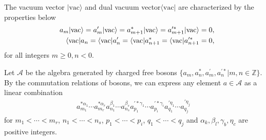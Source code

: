 \documentclass[10pt,a4paper]{amsart}
\numberwithin{equation}{section}
\begin{document}
The vacuum vector $|\text{vac}\rangle$ and  dual vacuum vector$\langle \text{vac}|$   are characterized by the properties below
\begin{eqnarray}\label{boson annihilation relations}
&&a_{m}|\text{vac}\rangle=a^{\prime}_{m}|\text{vac}\rangle
=a^{\ast}_{m+1}|\text{vac}\rangle=a^{\prime\ast}_{m+1}|\text{vac}\rangle=0,\notag\\
&&\langle\text{vac}|a_{n}=\langle\text{vac}|a^{\prime}_{n}
=\langle\text{vac}|a^{\ast}_{n+1}=\langle\text{vac}|a^{\prime\ast}_{n+1}=0,
\end{eqnarray}
for all integers $m\geq0, n<0$.




Let $\mathcal{A}$ be the algebra generated by charged free bosons $\{a_{m},a^{\ast}_{n},a^{\prime}_{m},a^{\prime\ast}_{n}|m,n\in\mathbb{Z}\}$. By the commutation relations of bosons, we can express any element $a\in\mathcal{A}$ as a linear combination
\begin{eqnarray}
a^{\ast\alpha_{1}}_{m_{1}}\cdots a^{\ast\alpha_{r}}_{m_{r}}a^{\beta_{1}}_{n_{1}}\cdots a^{\beta_{s}}_{n_{s}}a^{\prime\ast\gamma_{1}}_{p_{1}}\cdots a^{\prime\ast\gamma_{i}}_{p_{i}}a^{\prime\eta_{1}}_{q_{1}}\cdots a^{\prime\eta_{j}}_{q_{j}}
\end{eqnarray}
for $m_{1}<\cdots<m_{r}$, $n_{1}<\cdots<n_{s}$, $p_{1}<\cdots<p_{i}$, $q_{1}<\cdots<q_{j}$ and $\alpha_{k},\beta_{l},\gamma_{b},\eta_{c}$ are positive integers.
\end{document}
